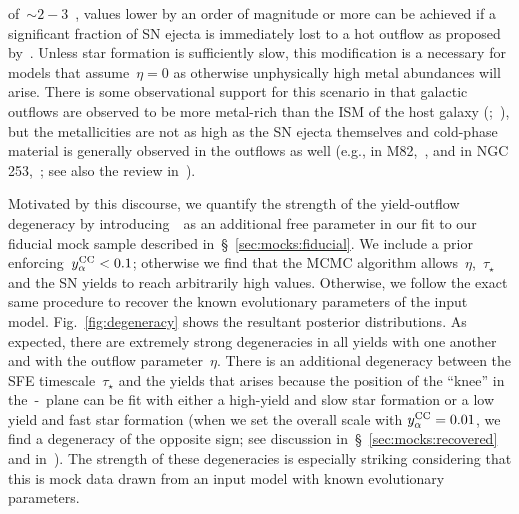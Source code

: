 of~$\sim2 - 3$~\citep{Griffith2021b}, values lower by an order of magnitude or
more can be achieved if a significant fraction of SN ejecta is immediately
lost to a hot outflow as proposed by~\citet{Peeples2011}.
Unless star formation is sufficiently slow, this modification is a necessary
for models that assume~$\eta = 0$ as otherwise unphysically high metal
abundances will arise.
There is some observational support for this scenario in that galactic outflows
are observed to be more metal-rich than the ISM of the host galaxy
(\citealp*{Chisholm2018};~\citealp{Cameron2021}), but the metallicities are
not as high as the SN ejecta themselves and cold-phase material is generally
observed in the outflows as well (e.g., in M82,~\citealp{Lopez2020}, and in
NGC 253,~\citealp{Lopez2023}; see also the review in~\citealt{Veilleux2020}).
\par
Motivated by this discourse, we quantify the strength of the yield-outflow
degeneracy by introducing~\yacc~as an additional free parameter in our fit to
our fiducial mock sample described in~\S~\ref{sec:mocks:fiducial}.
We include a prior enforcing~$y_\alpha^\text{CC} < 0.1$; otherwise we find that the MCMC
algorithm allows~$\eta$,~$\tau_\star$ and the SN yields to reach arbitrarily
high values.
Otherwise, we follow the exact same procedure to recover the known evolutionary
parameters of the input model.
Fig.~\ref{fig:degeneracy} shows the resultant posterior distributions.
As expected, there are extremely strong degeneracies in all yields with one
another and with the outflow parameter~$\eta$.
There is an additional degeneracy between the SFE timescale~$\tau_\star$ and
the yields that arises because the position of the ``knee'' in
the~\afe-\feh~plane can be fit with either a high-yield and slow star formation
or a low yield and fast star formation (when we set the overall scale with
$y_\alpha^\text{CC} = 0.01$, we find a degeneracy of the opposite sign; see discussion
in~\S~\ref{sec:mocks:recovered} and in~\citealt{Weinberg2017b}).
The strength of these degeneracies is especially striking considering that this
is mock data drawn from an input model with known evolutionary parameters.

